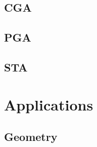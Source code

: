 \subsection{CGA}

\subsection{PGA}

\subsection{STA}

\section{Applications}

\subsection{Geometry}

